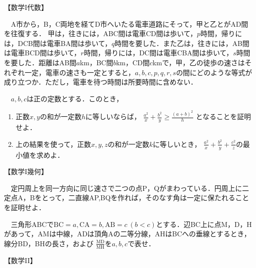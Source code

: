 \begin{center}
  【数学I代数】
\end{center}

\begin{problem}
  　A市から，B，C両地を経てD市へいたる電車道路にそって，甲と乙とがAD間を往復する．
  甲は，往きには，ABC間は電車CD間は歩いて，$p$時間，帰りには，DCB間は電車BA間は歩いて，$q$時間を要した．また乙は，往きには，AB間は電車BCD間は歩いて，$r$時間，帰りには，DC間は電車CBA間は歩いて，$s$時間を要した．距離はAB間$a$km，BC間$b$km，CD間$c$kmで，甲，乙の徒歩の速さはそれぞれ一定，電車の速さも一定とすると，$a,b,c,p,q,r,s$の間にどのような等式が成り立つか．ただし，電車を待つ時間は所要時間に含めない．
\end{problem}

\begin{problem}
  　$a,b,c$は正の定数とする．このとき，
  \begin{enumerate}
    \item 正数$x,y$の和が一定数$h$に等しいならば，
    $\frac{a^2}{x} + \frac  {b^2}{y} \geq \frac{(a+b)^2}{h}$
    となることを証明せよ．
    \item 上の結果を使って，正数$x,y,z$の和が一定数$k$に等しいとき，
    $\frac{a^2}{x} + \frac{b^2}{y} + \frac{c^2}{z}$の最小値を求めよ．
  \end{enumerate}
\end{problem}


\begin{center}
  【数学I幾何】
\end{center}

\begin{problem}
  　定円周上を同一方向に同じ速さで二つの点P，Qがまわっている．円周上に二定点A，Bをとって，二直線AP,BQを作れば，そのなす角は一定に保たれることを証明せよ．
\end{problem}

\begin{problem}
  　三角形ABCで$\mathrm{BC} = a,\mathrm{CA} = b, \mathrm{AB} = c\ (b<c)$とする．辺BC上に点M，D，Hがあって，AMは中線，ADは頂角Aの二等分線，AHはBCへの垂線とするとき，線分BD，BHの長さ，および
  $\frac{\mathrm{MD}}{\mathrm{MH}}$を$a,b,c$で表せ．
\end{problem}


\begin{center}
  【数学II】
\end{center}

